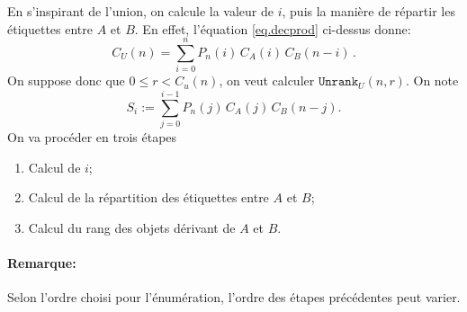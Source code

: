 \documentclass[11pt]{article}
\begin{document}
\begin{itemize}
  En s'inspirant de l'union, on calcule la valeur de $i$, puis la manière de
  répartir les étiquettes entre $A$ et $B$. En effet, l'équation
  \ref{eq.decprod} ci-dessus donne:
  \begin{equation}
    C_U(n) = \sum_{i=0}^n P_n(i)\,C_A(i)\,C_B(n-i)\,.
  \end{equation}
  On suppose donc que $0\leq r<C_u(n)$, on veut calculer
  $\texttt{Unrank}_U(n,r)$. On note
  $$
  S_i := \sum_{j=0}^{i-1} P_n(j)\,C_A(j)\,C_B(n-j).
  $$
  On va procéder en trois étapes
  \begin{enumerate}
  \item Calcul de $i$;
  \item Calcul de la répartition des étiquettes entre $A$ et $B$;
  \item Calcul du rang des objets dérivant de $A$ et $B$.
  \end{enumerate}
  \paragraph{Remarque:}
  Selon l'ordre choisi pour l'énumération, l'ordre des étapes précédentes peut
  varier.
  \bigskip


\end{itemize}
\end{document}

